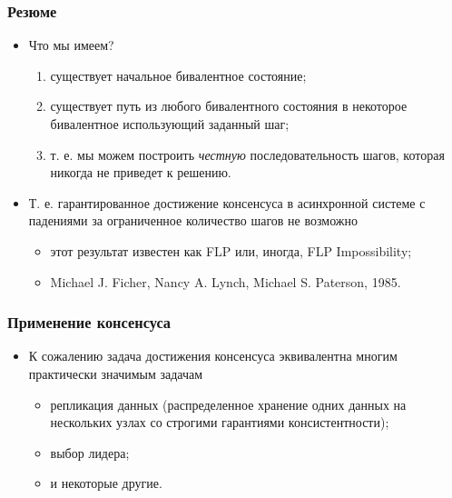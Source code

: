 \begin{frame}
\frametitle{Резюме}
\begin{itemize}
  \item Что мы имеем?
  \begin{enumerate}
    \item существует начальное бивалентное состояние;
    \item существует путь из любого бивалентного состояния в некоторое
    бивалентное использующий заданный шаг;
    \item т. е. мы можем построить \emph{честную} последовательность шагов,
    которая никогда не приведет к решению.
  \end{enumerate}
  \item Т. е. гарантированное достижение консенсуса в асинхронной системе с
  падениями за ограниченное количество шагов не возможно
  \begin{itemize}
    \item этот результат известен как FLP или, иногда, FLP Impossibility;
    \item Michael J. Ficher, Nancy A. Lynch, Michael S. Paterson, 1985.
  \end{itemize}
\end{itemize}
\end{frame}

\begin{frame}
\frametitle{Применение консенсуса}
\begin{itemize}
  \item К сожалению задача достижения консенсуса эквивалентна многим практически
  значимым задачам
  \begin{itemize}
    \item репликация данных (распределенное хранение одних данных на нескольких 
    узлах со строгими гарантиями консистентности);
    \item выбор лидера;
    \item и некоторые другие.
  \end{itemize}
\end{itemize}
\end{frame}

